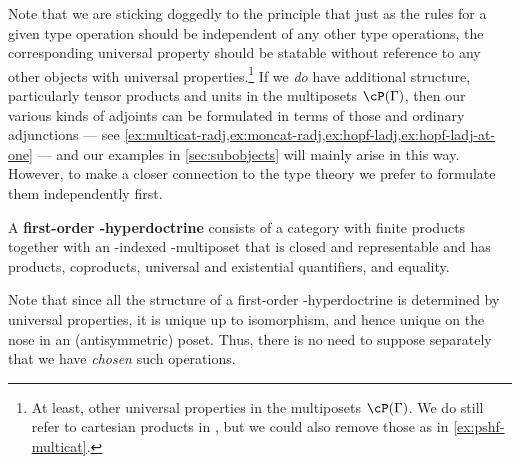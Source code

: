 Note that we are sticking doggedly to the principle that just as the rules for a given type operation should be independent of any other type operations, the corresponding universal property should be statable without reference to any other objects with universal properties.\footnote{At least, other universal properties in the multiposets $\cP(\Gamma)$.
We do still refer to cartesian products in \cS, but we could also remove those as in \cref{ex:pshf-multicat}.}
If we \emph{do} have additional structure, particularly tensor products and units in the multiposets $\cP(\Gamma)$, then our various kinds of adjoints can be formulated in terms of those and ordinary adjunctions --- see \cref{ex:multicat-radj,ex:moncat-radj,ex:hopf-ladj,ex:hopf-ladj-at-one} --- and our examples in \cref{sec:subobjects} will mainly arise in this way.
However, to make a closer connection to the type theory we prefer to formulate them independently first.

\begin{defn}
  A \textbf{first-order \fS-hyperdoctrine} consists of a category \cS with finite products together with an \cS-indexed \fS-multiposet that is closed and representable and has products, coproducts, universal and existential quantifiers, and equality.
\end{defn}

Note that since all the structure of a first-order \fS-hyperdoctrine is determined by universal properties, it is unique up to isomorphism, and hence unique on the nose in an (antisymmetric) poset.
Thus, there is no need to suppose separately that we have \emph{chosen} such operations.

